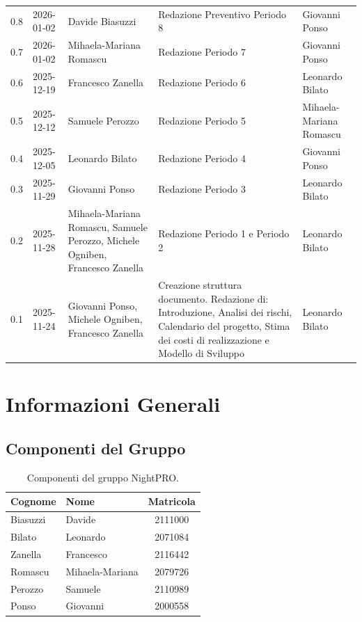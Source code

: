 \documentclass[a4paper, 11pt, oneside]{scrartcl} %
\begin{document}
{\begin{longtable}{@{}llp{}p{}p{}@{}}
0.8 & 2026-01-02 & Davide Biasuzzi & Redazione Preventivo Periodo 8 & Giovanni Ponso \\
0.7 & 2026-01-02 & Mihaela-Mariana Romascu & Redazione Periodo 7 & Giovanni Ponso \\
0.6 & 2025-12-19 & Francesco Zanella & Redazione Periodo 6 & Leonardo Bilato \\
0.5 & 2025-12-12 & Samuele Perozzo & Redazione Periodo 5 & Mihaela-Mariana Romascu \\
0.4 & 2025-12-05 & Leonardo Bilato & Redazione Periodo 4 & Giovanni Ponso \\
0.3 & 2025-11-29 & Giovanni Ponso & Redazione Periodo 3 & Leonardo Bilato \\
0.2 & 2025-11-28 & Mihaela-Mariana Romascu, Samuele Perozzo, Michele Ogniben, Francesco Zanella & Redazione Periodo 1 e Periodo 2 & Leonardo Bilato \\
0.1 & 2025-11-24 & Giovanni Ponso, Michele Ogniben, Francesco Zanella & Creazione struttura documento. Redazione di: Introduzione, Analisi dei rischi, Calendario del progetto, Stima dei costi di realizzazione e Modello di Sviluppo & Leonardo Bilato \\
\end{longtable}
}
\newpage
\tableofcontents 
\pagestyle{fancy} 

\newpage
\section*{Informazioni Generali}

\subsection*{Componenti del Gruppo}

\begin{table}[h!]
\centering
\renewcommand{\arraystretch}{1.2} 
\begin{tabular}{@{}llc@{}}
\toprule
\textbf{Cognome} & \textbf{Nome} & \textbf{Matricola} \\
\midrule
Biasuzzi & Davide & 2111000 \\
Bilato & Leonardo & 2071084 \\
Zanella & Francesco & 2116442 \\
Romascu & Mihaela-Mariana & 2079726 \\
Perozzo & Samuele & 2110989 \\
Ponso & Giovanni & 2000558 \\
\bottomrule
\end{tabular}
\caption{Componenti del gruppo NightPRO.}
\label{tab_fig_componenti_del_gruppo_nightpro}
\end{table}
\end{document}
